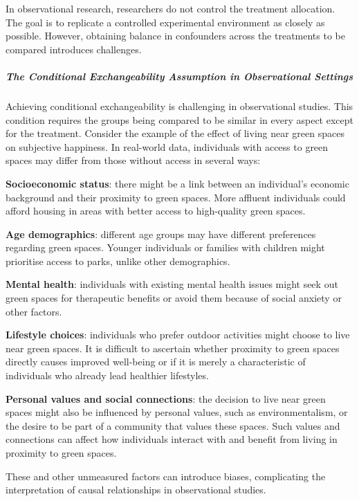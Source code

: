\documentclass[
  singlecolumn]{article}
\let\oldsubparagraph\subparagraph
\renewcommand{\subparagraph}[1]{\oldsubparagraph{#1}\mbox{}}
\begin{document}
In observational research, researchers do not control the treatment
allocation. The goal is to replicate a controlled experimental
environment as closely as possible. However, obtaining balance in
confounders across the treatments to be compared introduces challenges.

\subparagraph{The Conditional Exchangeability Assumption in
Observational
Settings}\label{the-conditional-exchangeability-assumption-in-observational-settings}

Achieving conditional exchangeability is challenging in observational
studies. This condition requires the groups being compared to be similar
in every aspect except for the treatment. Consider the example of the
effect of living near green spaces on subjective happiness. In
real-world data, individuals with access to green spaces may differ from
those without access in several ways:

\textbf{Socioeconomic status}: there might be a link between an
individual's economic background and their proximity to green spaces.
More affluent individuals could afford housing in areas with better
access to high-quality green spaces.

\textbf{Age demographics}: different age groups may have different
preferences regarding green spaces. Younger individuals or families with
children might prioritise access to parks, unlike other demographics.

\textbf{Mental health}: individuals with existing mental health issues
might seek out green spaces for therapeutic benefits or avoid them
because of social anxiety or other factors.

\textbf{Lifestyle choices}: individuals who prefer outdoor activities
might choose to live near green spaces. It is difficult to ascertain
whether proximity to green spaces directly causes improved well-being or
if it is merely a characteristic of individuals who already lead
healthier lifestyles.

\textbf{Personal values and social connections}: the decision to live
near green spaces might also be influenced by personal values, such as
environmentalism, or the desire to be part of a community that values
these spaces. Such values and connections can affect how individuals
interact with and benefit from living in proximity to green spaces.

These and other unmeasured factors can introduce biases, complicating
the interpretation of causal relationships in observational studies.
\end{document}
